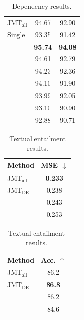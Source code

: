 \documentclass[11pt,a4paper]{article}
\begin{document}
\begin{table}[t!]
\begin{minipage}[t]{.35\textwidth}
\begin{center}
{\begin{tabular}{l|cc}
	JMT$_{\mathrm{all}}$ &  94.67 & 92.90 \\
    Single & 93.35 & 91.42 \\ \hline
	\citet{biaffine2017} & {\bf 95.74} & {\bf 94.08} \\
	\citet{andor2016} &  94.61 & 92.79  \\
	\citet{alberti2016} & 94.23 & 92.36 \\
    \citet{zhang2017head} & 94.10 & 91.90 \\
    \citet{weiss2015dep} & 93.99 & 92.05 \\
    \citet{dyer2015dep} & 93.10 & 90.90 \\
    \citet{bohnet:2010dep} & 92.88 & 90.71 \\ \hline
  \end{tabular}
}
    \caption{Dependency results.}
    \label{table:dep}
  \end{center}
\end{minipage}

\end{table}


\begin{table}[t!]

\begin{minipage}[t]{.45\textwidth}
  \begin{center}
{\scriptsize
	\begin{tabular}{l|c}
    Method   & MSE $\downarrow$ \\ \hline
	JMT$_{\mathrm{all}}$ &  {\bf 0.233}  \\
    JMT$_{\mathrm{DE}}$ &  0.238  \\ \hline
	\citet{zhou2016coling} &  0.243  \\
    \citet{tai2015treelstm} & 0.253 \\ \hline
  \end{tabular}
}
    \caption{Semantic relatedness results.}
    \label{table:relate}
  \end{center}
\end{minipage}
\hfill
\begin{minipage}[t]{.45\textwidth}
  \begin{center}
{\scriptsize
	\begin{tabular}{l|c}
    Method   & Acc. $\uparrow$ \\ \hline
	JMT$_{\mathrm{all}}$ &  86.2  \\
	JMT$_{\mathrm{DE}}$ &  {\bf 86.8}  \\ \hline
	\citet{yin2016abcnn} &  86.2  \\
    \citet{lai2014semeval} & 84.6 \\ \hline
  \end{tabular}
}
    \caption{Textual entailment results.}
    \label{table:entail}
  \end{center}
\end{minipage}
  
\end{table}
\end{document}
